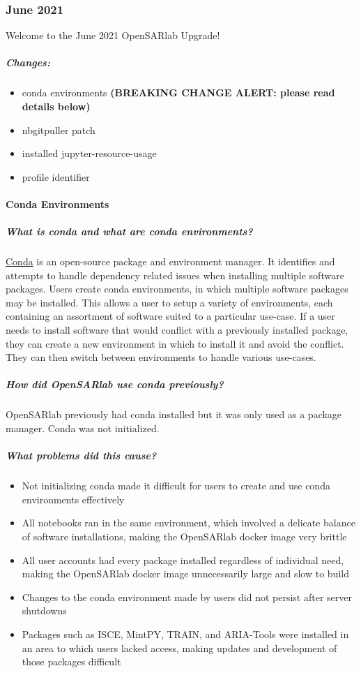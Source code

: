 \subsubsection{June 2021}

Welcome to the June 2021 OpenSARlab Upgrade!

\subparagraph{Changes:}

\begin{itemize}
\item conda environments \textbf{(BREAKING CHANGE ALERT: please read details below)}
\item nbgitpuller patch
\item installed jupyter-resource-usage
\item profile identifier
\end{itemize}

\paragraph{Conda Environments}

\subparagraph{What is conda and what are conda environments?}

\href{https://docs.conda.io/en/latest/}{Conda} is an open-source package and environment manager. It identifies and attempts to handle dependency related issues when installing multiple software packages. Users create conda environments, in which multiple software packages may be installed. This allows a user to setup a variety of environments, each containing an assortment of software suited to a particular use-case. If a user needs to install software that would conflict with a previously installed package, they can create a new environment in which to install it and avoid the conflict. They can then switch between environments to handle various use-cases.

\subparagraph{How did OpenSARlab use conda previously?}

OpenSARlab previously had conda installed but it was only used as a package manager. Conda was not initialized.

\subparagraph{What problems did this cause?}

\begin{itemize}
\item Not initializing conda made it difficult for users to create and use conda environments effectively
\item All notebooks ran in the same environment, which involved a delicate balance of software installations, making the OpenSARlab docker image very brittle
\item All user accounts had every package installed regardless of individual need, making the OpenSARlab docker image unnecessarily large and slow to build
\item Changes to the conda environment made by users did not persist after server shutdowns
\item Packages such as ISCE, MintPY, TRAIN, and ARIA-Tools were installed in an area to which users lacked access, making updates and development of those packages difficult
\end{itemize}

